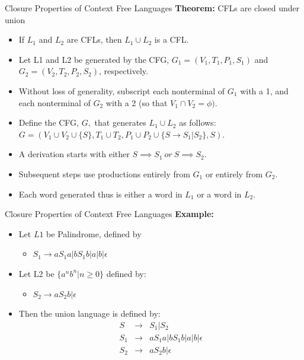\documentclass{beamer}
\begin{document}
\begin{frame}{Closure Properties of Context Free Languages}
	\textbf{Theorem:} CFLs are closed under union
	\begin{itemize}
		\item If $L_1$ and $L_2$ are CFLs, then $L_1 \cup L_2$ is a CFL.
	\end{itemize}
\proofname 
\begin{itemize}
	\item Let L1 and L2 be generated by the CFG, $G_1 = (V_1, T_1, P_1, S_1)$ and
	$G_2 = (V_2, T_2, P_2, S_2)$, respectively.
	\item Without loss of generality, subscript each nonterminal of $G_1$ with a 1,
	and each nonterminal of $G_2$ with a 2 (so that $V_1 \cap V_2 = \phi)$.
	\item Define the CFG, $G,$ that generates $L_1 \cup L_2$ as follows:
	$G = (V_1 \cup V_2 \cup \{S\}, T_1 \cup T_2, P_1 \cup P_2 \cup \{S \rightarrow S_1 | S_2\}, S).$
	\item A derivation starts with either $S \implies S_1\  or\  S \implies S_2.$
	\item Subsequent steps use productions entirely from $G_1$ or entirely from
	$G_2$.
	\item Each word generated thus is either a word in $L_1$ or a word in $L_2$.

\end{itemize}
\end{frame}
\begin{frame}{Closure Properties of Context Free Languages}
	\textbf{Example:}
	\begin{itemize}
		\item Let $L1$ be Palindrome, defined by
		\begin{itemize}
			\item $S_1\rightarrow aS_1a | bS_1b | a | b | \epsilon$
		\end{itemize}
	\item Let L2 be $\{a^nb^n	|n \geq 0\}$ defined by:
	\begin{itemize}
		\item $S_2\rightarrow aS_2b | \epsilon$
	\end{itemize}
\item Then the union language is defined by:
\begin{eqnarray*}
	S &\rightarrow& S_1 | S_2 \\
	S_1 &\rightarrow& aS_1a | bS_1b | a | b | \epsilon \\
	S_2 &\rightarrow& aS_2b | \epsilon \\
\end{eqnarray*}
	\end{itemize}
\end{frame}
\end{document}

